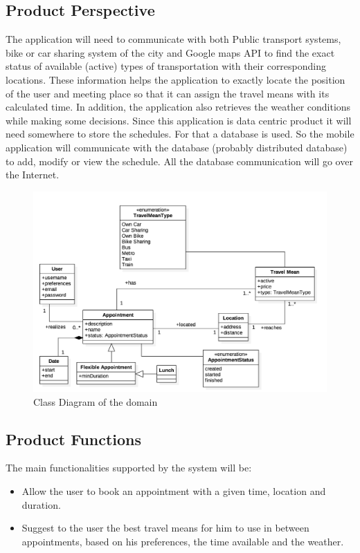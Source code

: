 \documentclass[12pt]{article}
\begin{document}
\subsection{Product Perspective}
The application will need to communicate with both Public transport systems, bike or car sharing system of the city and Google maps API to find the exact status of available (active) types of transportation with their corresponding locations. These information helps the application to exactly locate the position of the user and meeting place so that it can assign the travel means with its calculated time. In addition, the application also retrieves the weather conditions while making some decisions. 
Since this application is data centric product it will need somewhere to store the schedules. For that a database is used. So the mobile application will communicate with the database (probably distributed database) to add, modify or view the schedule. All the database communication will go over the Internet.
    \begin{figure}[ht]
        \includegraphics[scale=0.52]{domainModel.png}
        \caption{Class Diagram of the domain}
    \label{fig:domainModel}
    \end{figure}
    
\subsection{Product Functions}
The main functionalities supported by the system will be:
\begin{itemize}
    \item Allow the user to book an appointment with a given time, location and duration.
    \item Suggest to the user the best travel means for him to use in between appointments, based on his preferences, the time available and the weather.
\end{itemize}
\end{document}
